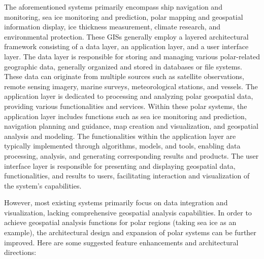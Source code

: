 The aforementioned systems primarily encompass ship navigation and monitoring, sea ice monitoring and prediction, polar mapping and geospatial information display, ice thickness measurement, climate research, and environmental protection. These GISs generally employ a layered architectural framework consisting of a data layer, an application layer, and a user interface layer. The data layer is responsible for storing and managing various polar-related geographic data, generally organized and stored in databases or file systems. These data can originate from multiple sources such as satellite observations, remote sensing imagery, marine surveys, meteorological stations, and vessels. The application layer is dedicated to processing and analyzing polar geospatial data, providing various functionalities and services. Within these polar systems, the application layer includes functions such as sea ice monitoring and prediction, navigation planning and guidance, map creation and visualization, and geospatial analysis and modeling. The functionalities within the application layer are typically implemented through algorithms, models, and tools, enabling data processing, analysis, and generating corresponding results and products. The user interface layer is responsible for presenting and displaying geospatial data, functionalities, and results to users, facilitating interaction and visualization of the system's capabilities.

However, most existing systems primarily focus on data integration and visualization, lacking comprehensive geospatial analysis capabilities. In order to achieve geospatial analysis functions for polar regions (taking sea ice as an example), the architectural design and expansion of polar systems can be further improved. Here are some suggested feature enhancements and architectural directions:

